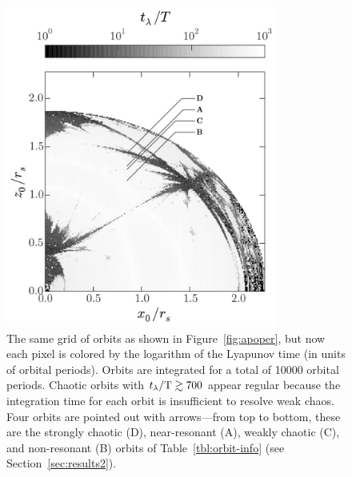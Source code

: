 \begin{figure}[!h]%
\begin{center}
\includegraphics[width=0.8\textwidth, trim={0 0 0 0}]{figures/ch3/lyap_map.pdf}
\caption{ The same grid of orbits as shown in Figure~\ref{fig:apoper}, but now each pixel is colored by the logarithm of the Lyapunov time (in units of orbital periods). Orbits are integrated for a total of 10000 orbital periods. Chaotic orbits with $t_\lambda/{\rm T} \gtrsim 700$ appear regular because the integration time for each orbit is insufficient to resolve weak chaos. Four orbits are pointed out with arrows---from top to bottom, these are the strongly chaotic (D), near-resonant (A), weakly chaotic (C), and non-resonant (B) orbits of Table~\ref{tbl:orbit-info} (see Section~\ref{sec:results2}).} \label{fig:lyapmap} 
\end{center}
\end{figure}

